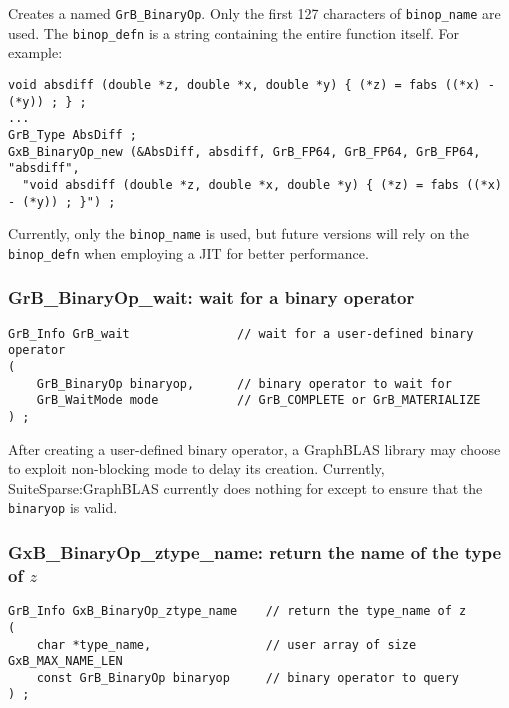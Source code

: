 \documentclass[12pt]{article}
\begin{document}
Creates a named \verb'GrB_BinaryOp'.  Only the first 127 characters of
\verb'binop_name' are used.  The \verb'binop_defn' is a string containing the
entire function itself.  For example:

{\footnotesize
\begin{verbatim}
void absdiff (double *z, double *x, double *y) { (*z) = fabs ((*x) - (*y)) ; } ;
...
GrB_Type AbsDiff ;
GxB_BinaryOp_new (&AbsDiff, absdiff, GrB_FP64, GrB_FP64, GrB_FP64, "absdiff",
  "void absdiff (double *z, double *x, double *y) { (*z) = fabs ((*x) - (*y)) ; }") ; \end{verbatim}}

Currently, only the \verb'binop_name' is used, but future versions will
rely on the \verb'binop_defn' when employing a JIT for better performance.

\newpage
\subsubsection{{\sf GrB\_BinaryOp\_wait:} wait for a binary operator}
\label{binaryop_wait}

\begin{mdframed}[userdefinedwidth=6in]
{\footnotesize
\begin{verbatim}
GrB_Info GrB_wait               // wait for a user-defined binary operator
(
    GrB_BinaryOp binaryop,      // binary operator to wait for
    GrB_WaitMode mode           // GrB_COMPLETE or GrB_MATERIALIZE
) ;
\end{verbatim}
}\end{mdframed}

After creating a user-defined binary operator, a GraphBLAS library may choose
to exploit non-blocking mode to delay its creation.  Currently,
SuiteSparse:GraphBLAS currently does nothing for except to ensure that the
\verb'binaryop' is valid.

\subsubsection{{\sf GxB\_BinaryOp\_ztype\_name:} return the name of the type of $z$}
\label{binaryop_ztype_name}

\begin{mdframed}[userdefinedwidth=6in]
{\footnotesize
\begin{verbatim}
GrB_Info GxB_BinaryOp_ztype_name    // return the type_name of z
(
    char *type_name,                // user array of size GxB_MAX_NAME_LEN
    const GrB_BinaryOp binaryop     // binary operator to query
) ;
\end{verbatim}
} \end{mdframed}
\end{document}
